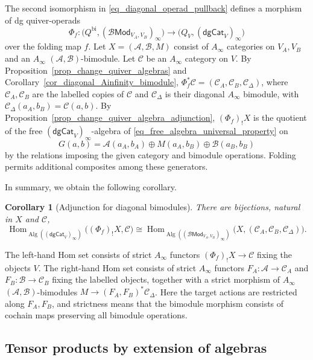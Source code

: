 \documentclass[11pt,letterpaper]{article}
\numberwithin{equation}{section}
\theoremstyle{plain}
\newtheorem{cor}[thm]{Corollary}
\theoremstyle{definition}
\theoremstyle{remark}
\begin{document}
The second isomorphism in \eqref{eq_diagonal_operad_pullback}
defines a morphism of dg quiver-operads
\[
 \Phi_f:
 \bigl(Q^{\mathrm{bi}},(\mathscr B\mathsf{Mod}_{V_A,V_B})_\infty\bigr)
 \longrightarrow
 \bigl(Q_V,(\mathsf{dgCat}_V)_\infty\bigr)
\]
over the folding map $f$.
Let $X=(\mathcal A,\mathcal B,M)$ consist of $A_\infty$ categories
on $V_A,V_B$ and an $A_\infty$ $(\mathcal A,\mathcal B)$-bimodule. Let
$\mathcal C$ be an $A_\infty$ category on $V$.
By Proposition~\ref{prop_change_quiver_algebras} and
Corollary~\ref{cor_diagonal_Ainfinity_bimodule},
$\Phi_f^*\mathcal C=(\mathcal C_A,\mathcal C_B,\mathcal C_\Delta)$,
where $\mathcal C_A,\mathcal C_B$ are the labelled copies of
$\mathcal C$ and $\mathcal C_\Delta$ is their diagonal $A_\infty$
bimodule, with $\mathcal C_\Delta(a_A,b_B)=\mathcal C(a,b)$.
By Proposition~\ref{prop_change_quiver_algebra_adjunction},
$(\Phi_f)_!X$ is the quotient of the free
$(\mathsf{dgCat}_V)_\infty$-algebra of
\eqref{eq_free_algebra_universal_property} on
\[
 G(a,b)=\mathcal A(a_A,b_A)\oplus M(a_A,b_B)\oplus\mathcal B(a_B,b_B)
\]
by the relations imposing the given category and bimodule operations.
Folding permits additional composites among these generators.

In summary, we obtain the following corollary.

\begin{cor}[Adjunction for diagonal bimodules]
\label{cor_diagonal_algebra_adjunction}
There are bijections, natural in $X$ and $\mathcal C$,
\begin{equation*}\operatorname{Hom}_{\operatorname{Alg}((\mathsf{dgCat}_V)_\infty)}
 \bigl((\Phi_f)_!X,\mathcal C\bigr) \cong
 \operatorname{Hom}_{\operatorname{Alg}((\mathscr B\mathsf{Mod}_{V_A,V_B})_\infty)}
 \bigl(X,(\mathcal C_A,\mathcal C_B,\mathcal C_\Delta)\bigr).
\end{equation*}
\end{cor}

The left-hand Hom set consists of strict $A_\infty$ functors
$(\Phi_f)_!X\to\mathcal C$ fixing the objects $V$.
The right-hand Hom set consists of strict $A_\infty$ functors
$F_A:\mathcal A\to\mathcal C_A$ and $F_B:\mathcal B\to\mathcal C_B$
fixing the labelled objects, together with a strict morphism of
$A_\infty$ $(\mathcal A,\mathcal B)$-bimodules
$M\to(F_A,F_B)^*\mathcal C_\Delta$.
Here the target actions are restricted along $F_A,F_B$, and
strictness means that the bimodule morphism consists of cochain
maps preserving all bimodule operations.

\subsection{Tensor products by extension of algebras}
\label{sss_derived_tensor_construction}
\end{document}
